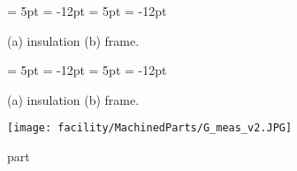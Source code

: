 \begin{figure}[h!]
  \begin{center}
  {\subfigcapskip = 5pt \subfigcapmargin = -12pt }
   {\subfigcapskip = 5pt \subfigcapmargin = -12pt  }
  \end{center}
\caption{(a) insulation (b) frame. } 
\label{fig:partsE}
\end{figure}

\begin{figure}[h!]
  \begin{center}
  {\subfigcapskip = 5pt \subfigcapmargin = -12pt }
   {\subfigcapskip = 5pt \subfigcapmargin = -12pt  }
  \end{center}
\caption{(a) insulation (b) frame. } 
\label{fig:partsF}
\end{figure}

\begin{figure}[h!]
\centering
\texttt{[image: facility/MachinedParts/G\_meas\_v2.JPG]}
\caption{ \footnotesize part}
\label{fig:partsG}
\end{figure}
